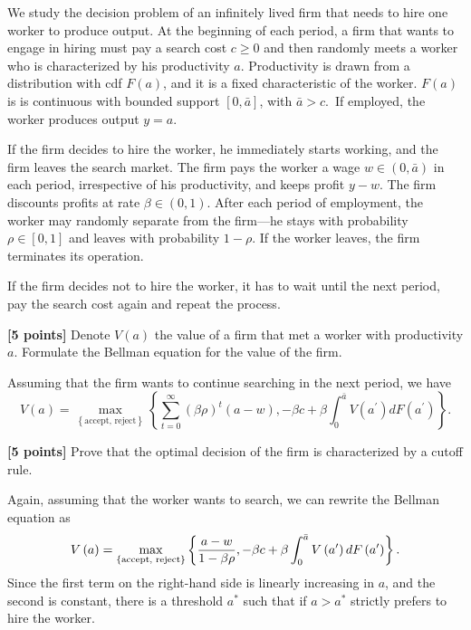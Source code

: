 \documentclass[11pt]{article}
\newenvironment{question}[1][Question]{}{}
\newenvironment{answer}[1][Answer]{}{}
\begin{document}
\setcounter{section}{1}

\noindent We study the decision problem of an infinitely lived firm that needs to hire
one worker to produce output. At the beginning of each period, a firm that
wants to engage in hiring must pay a search cost $c\geq 0$ and then randomly
meets a worker who is characterized by his productivity $a$. Productivity is
drawn from a distribution with cdf $F\left( a\right) $, and it is a fixed
characteristic of the worker. $F\left( a\right) $ is is continuous with
bounded support $\left[ 0,\bar{a}\right] $, with $\bar{a}>c$.\ If employed,
the worker produces output $y=a$.

If the firm decides to hire the worker, he immediately starts working, and
the firm leaves the search market. The firm pays the worker a wage $w\in
\left( 0,\bar{a}\right) $ in each period, irrespective of his productivity,
and keeps profit $y-w$. The firm discounts profits at rate $\beta \in \left(
0,1\right) $. After each period of employment, the worker may randomly
separate from the firm---he stays with probability $\rho \in \left[ 0,1%
\right] $ and leaves with probability $1-\rho $. If the worker leaves, the
firm terminates its operation.

If the firm decides not to hire the worker, it has to wait until the next
period, pay the search cost again and repeat the process.

\begin{question}
\textbf{[5 points]} Denote $V\left( a\right) $ the value of a firm that met
a worker with productivity $a$. Formulate the Bellman equation for the value
of the firm.

\begin{answer}
Assuming that the firm wants to continue searching in the next period, we
have%
\begin{equation*}
V\left( a\right) =\max_{\left\{ \text{accept, reject}\right\} }\left\{
\sum_{t=0}^{\infty }\left( \beta \rho \right) ^{t}\left( a-w\right) ,-\beta
c+\beta \int_{0}^{\bar{a}}V\left( a^{\prime }\right) dF\left( a^{\prime
}\right) \right\} .
\end{equation*}
\end{answer}
\end{question}

\begin{question}
\textbf{[5 points]} Prove that the optimal decision of the firm is
characterized by a cutoff rule.

\begin{answer}
Again, assuming that the worker wants to search, we can rewrite the Bellman
equation as%
\begin{equation*}
V\left( a\right) =\max_{\left\{ \text{accept, reject}\right\} }\left\{ \frac{%
a-w}{1-\beta \rho },-\beta c+\beta \int_{0}^{\bar{a}}V\left( a^{\prime
}\right) dF\left( a^{\prime }\right) \right\} .
\end{equation*}%
Since the first term on the right-hand side is linearly increasing in $a$,
and the second is constant, there is a threshold $a^{\ast }$ such that if $%
a>a^{\ast }$ strictly prefers to hire the worker.
\end{answer}
\end{question}
\end{document}
